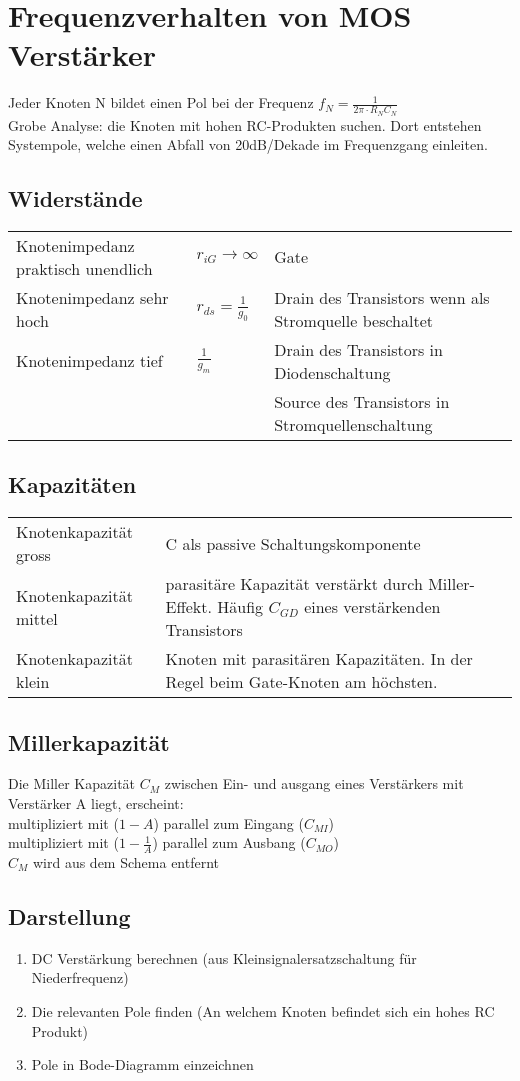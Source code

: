 \section{Frequenzverhalten von MOS Verstärker}
Jeder Knoten N bildet einen Pol bei der Frequenz
$f_N=\frac{1}{2\pi\cdot R_NC_N}$\\
Grobe Analyse: die Knoten mit hohen RC-Produkten suchen. Dort entstehen
Systempole, welche einen Abfall von 20dB/Dekade im Frequenzgang einleiten.
\subsection{Widerstände}
\begin{tabular}{lll}
	Knotenimpedanz praktisch unendlich & $r_{iG}\rightarrow\infty$ & Gate \\
	Knotenimpedanz sehr hoch & $r_{ds}=\frac{1}{g_0}$ & Drain des Transistors wenn
	als Stromquelle beschaltet\\
	Knotenimpedanz tief & $\frac{1}{g_m}$ & Drain des Transistors in
	Diodenschaltung \\
	& & Source des Transistors in Stromquellenschaltung \\
\end{tabular}
\subsection{Kapazitäten}
\begin{tabular}{p{4cm}p{14cm}}
	Knotenkapazität gross & C als passive Schaltungskomponente \\
	Knotenkapazität mittel & parasitäre Kapazität verstärkt durch Miller-Effekt.
	Häufig $C_{GD}$ eines verstärkenden Transistors\\
	Knotenkapazität klein & Knoten mit parasitären Kapazitäten. In der Regel beim
	Gate-Knoten am höchsten.
\end{tabular}
\subsection{Millerkapazität}
Die Miller Kapazität $C_M$ zwischen Ein- und ausgang eines Verstärkers mit
Verstärker A liegt, erscheint:\\
multipliziert mit ($1-A$) parallel zum Eingang ($C_{MI}$)\\
multipliziert mit ($1-\frac{1}{A}$) parallel zum Ausbang ($C_{MO}$)\\
$C_M$ wird aus dem Schema entfernt\\
\subsection{Darstellung}
\begin{enumerate}
  \item DC Verstärkung berechnen (aus Kleinsignalersatzschaltung für
  Niederfrequenz)
  \item Die relevanten Pole finden (An welchem Knoten befindet sich ein hohes
  RC Produkt)
  \item Pole in Bode-Diagramm einzeichnen
\end{enumerate}